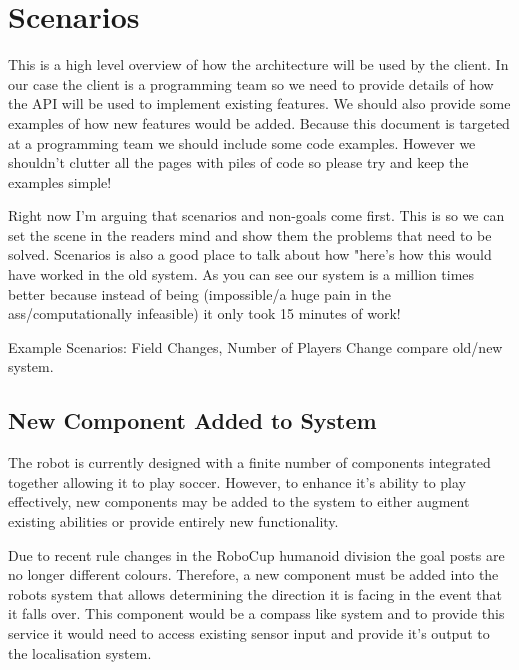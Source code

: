 \documentclass[english,12pt]{scrartcl}
\begin{document}
    \section{Scenarios}
        This is a high level overview of how the architecture will be used by the client. In our
        case the client is a programming team so we need to provide details of how the API will be
        used to implement existing features. We should also provide some examples of how new 
        features would be added. Because this document is targeted at a programming team we should
        include some code examples. However we shouldn't clutter all the pages with piles of code so 
        please try and keep the examples simple!

        Right now I'm arguing that scenarios and non-goals come first. This is so we can set the
        scene in the readers mind and show them the problems that need to be solved. Scenarios is
        also a good place to talk about how "here's how this would have worked in the old system. As
        you can see our system is a million times better because instead of being (impossible/a huge 
        pain in the ass/computationally infeasible) it only took 15 minutes of work!

        Example Scenarios: Field Changes, Number of Players Change compare old/new system.
        
        \subsection{New Component Added to System}
        	The robot is currently designed with a finite number of components integrated together
			allowing it to play soccer. However, to enhance it's ability to play effectively, new
			components may be added to the system to either augment existing abilities or provide
			entirely new functionality.
			
			Due to recent rule changes in the RoboCup humanoid division
			\cite[Section 1.2]{humanoid2013rules} the goal posts are no longer different colours.
			Therefore, a new component must be added into the robots system that allows determining 
			the direction it is facing in the event that it falls over. This component would be a
			compass like system and to provide this service it would need to access existing sensor
			input and provide it's output to the localisation system.
			
	
\end{document}

